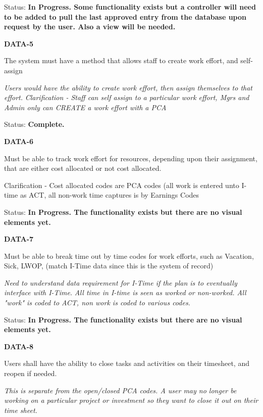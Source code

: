 \documentclass{article}
\begin{document}
\noindent Status: \textbf{In Progress.  Some functionality exists but a controller will need to be added to pull the last approved entry from the database upon request by the user.  Also a view will be needed.}\textit{}

\noindent 

\noindent \textbf{DATA-5}

\noindent The system must have a method that allows staff to create work effort, and self-assign

\noindent \textit{Users would have the ability to create work effort, then assign themselves to that effort.} \textit{Clarification - Staff can self assign to a particular work effort, Mgrs and Admin only can CREATE a work effort with a PCA}

Status: \textbf{Complete.}\textit{}

\noindent 

\noindent \textbf{DATA-6}

\noindent Must be able to track work effort for resources, depending upon their assignment, that are either cost allocated or not cost allocated. 

\noindent Clarification - Cost allocated codes are PCA codes (all work is entered unto I-time as ACT, all non-work time captures is by Earnings Codes\textit{}

Status: \textbf{In Progress.  The functionality exists but there are no visual elements yet.}\textit{}

\noindent 

\noindent \textbf{DATA-7}

\noindent Must be able to break time out by time codes for work efforts, such as Vacation, Sick, LWOP, (match I-Time data since this is the system of record)

\noindent \textit{Need to understand data requirement for I-Time if the plan is to eventually interface with I-Time.} \textit{All time in I-time is seen as worked or non-worked.  All "work" is coded to ACT, non work is coded to various codes.}

\textit{ }Status: \textbf{In Progress.  The functionality exists but there are no visual elements yet.}

\noindent 

\noindent \textbf{DATA-8}

\noindent Users shall have the ability to close tasks and activities on their timesheet, and reopen if needed.

\noindent \textit{This is separate from the open/closed PCA codes.  A user may no longer be working on a particular project or investment so they want to close it out on their time sheet.}
\end{document}
